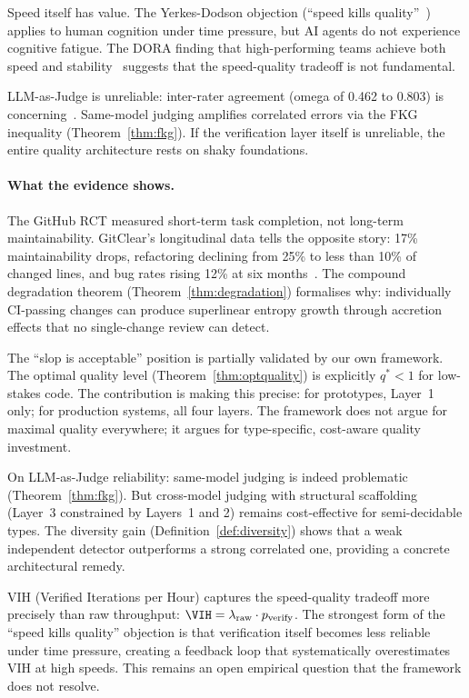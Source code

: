 \documentclass[11pt, a4paper, logo, copyright]{googledeepmind}
\begin{document}
Speed itself has value. The Yerkes-Dodson objection (``speed kills quality''~\citep{yerkes1908relation}) applies to human cognition under time pressure, but AI agents do not experience cognitive fatigue. The DORA finding that high-performing teams achieve both speed and stability~\citep{forsgren2018accelerate} suggests that the speed-quality tradeoff is not fundamental.

LLM-as-Judge is unreliable: inter-rater agreement (omega of 0.462 to 0.803) is concerning~\citep{llmjudgetrust2024}. Same-model judging amplifies correlated errors via the FKG inequality (Theorem~\ref{thm:fkg}). If the verification layer itself is unreliable, the entire quality architecture rests on shaky foundations.

\paragraph{What the evidence shows.}
The GitHub RCT measured short-term task completion, not long-term maintainability. GitClear's longitudinal data tells the opposite story: 17\% maintainability drops, refactoring declining from 25\% to less than 10\% of changed lines, and bug rates rising 12\% at six months~\citep{gitclear2025}. The compound degradation theorem (Theorem~\ref{thm:degradation}) formalises why: individually CI-passing changes can produce superlinear entropy growth through accretion effects that no single-change review can detect.

The ``slop is acceptable'' position is partially validated by our own framework. The optimal quality level (Theorem~\ref{thm:optquality}) is explicitly $q^* < 1$ for low-stakes code. The contribution is making this precise: for prototypes, Layer~1 only; for production systems, all four layers. The framework does not argue for maximal quality everywhere; it argues for type-specific, cost-aware quality investment.

On LLM-as-Judge reliability: same-model judging is indeed problematic (Theorem~\ref{thm:fkg}). But cross-model judging with structural scaffolding (Layer~3 constrained by Layers~1 and 2) remains cost-effective for semi-decidable types. The diversity gain (Definition~\ref{def:diversity}) shows that a weak independent detector outperforms a strong correlated one, providing a concrete architectural remedy.

VIH (Verified Iterations per Hour) captures the speed-quality tradeoff more precisely than raw throughput: $\VIH = \lambda_{\mathrm{raw}} \cdot p_{\mathrm{verify}}$. The strongest form of the ``speed kills quality'' objection is that verification itself becomes less reliable under time pressure, creating a feedback loop that systematically overestimates VIH at high speeds. This remains an open empirical question that the framework does not resolve.
\end{document}
